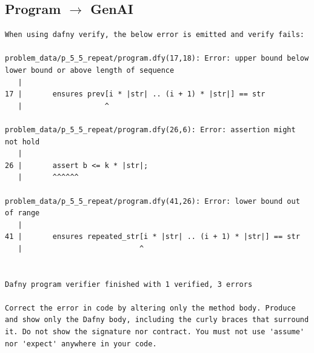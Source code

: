\documentclass{article}
\begin{document}
\subsection*{Program $\rightarrow$ GenAI}
\begin{lstlisting}
When using dafny verify, the below error is emitted and verify fails:

problem_data/p_5_5_repeat/program.dfy(17,18): Error: upper bound below lower bound or above length of sequence
   |
17 |       ensures prev[i * |str| .. (i + 1) * |str|] == str
   |                   ^

problem_data/p_5_5_repeat/program.dfy(26,6): Error: assertion might not hold
   |
26 |       assert b <= k * |str|;
   |       ^^^^^^

problem_data/p_5_5_repeat/program.dfy(41,26): Error: lower bound out of range
   |
41 |       ensures repeated_str[i * |str| .. (i + 1) * |str|] == str
   |                           ^


Dafny program verifier finished with 1 verified, 3 errors

Correct the error in code by altering only the method body. Produce and show only the Dafny body, including the curly braces that surround it. Do not show the signature nor contract. You must not use 'assume' nor 'expect' anywhere in your code.
\end{lstlisting}
\end{document}
